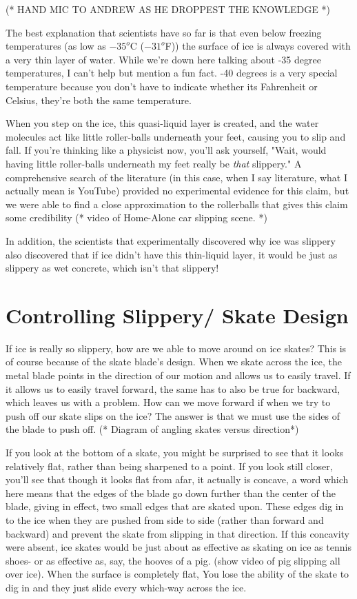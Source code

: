 \documentclass[12pt]{article}
\begin{document}
(* HAND MIC TO ANDREW AS HE DROPPEST THE KNOWLEDGE *)

The best explanation that scientists have so far is that even below freezing 
temperatures (as low as $-35^o$C ($-31^{o}$F)) the surface of ice is always 
covered with a very thin layer of water. While we're down here talking about 
-35 degree temperatures, I can't help but mention a fun fact. -40 degrees is a 
very special temperature because you don't have to indicate whether its 
Fahrenheit or Celsius, they're both the same temperature. 

When you step on the ice,  this quasi-liquid layer is created, and the
water molecules 
act like little roller-balls underneath your feet, causing you to slip and fall. 
If you're thinking like a physicist now, you'll ask yourself, "Wait, would having
little roller-balls underneath my feet really be \emph{that} slippery." A 
comprehensive search of the literature (in this case, when I say literature, 
what I actually mean is YouTube) provided no experimental 
evidence for this claim, but we were able to find a close approximation to 
the rollerballs that gives this claim some credibility (* video of Home-Alone
car slipping scene. *) 

In addition, the scientists that experimentally discovered why ice was slippery 
also discovered that if ice didn't have this thin-liquid layer, it would be 
just as slippery as wet concrete, which 
isn't that slippery!

\section{Controlling Slippery/ Skate Design}
If ice is really so slippery, how are we able to move around on ice skates? This is 
of course because of the skate blade's design. When we skate across the ice, the metal blade
points in the direction of our motion and allows us to easily travel. If it allows us to easily 
travel forward, the same has to also be true for backward, which leaves us with a problem. 
How can we move forward if when we try to push off our skate slips on the ice? The answer
is that we must use the sides of the blade to push off. (* Diagram of angling skates versus 
direction*) 

If you look at the bottom of a skate, you might be surprised to see that it looks relatively
flat, rather than being sharpened to a point. If you look still closer, you'll see that 
though it looks flat from afar, it actually is concave, a word which here means that the
edges of the blade go down further than the center of the blade, giving in effect, two small 
edges that are skated upon. These edges dig in to the ice when they are pushed from side
to side (rather than forward and backward) and prevent the skate from slipping in that direction. 
If this concavity were absent, ice skates would be just about as
effective as skating on ice as tennis shoes- or as effective as, say, the hooves of a pig.
(show video of pig slipping all over ice). When the surface is completely flat, 
You lose the ability of the skate to dig in
and they just slide every which-way across the ice. 
\end{document}
